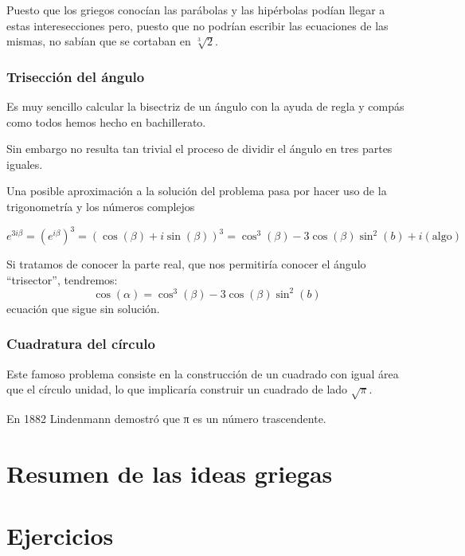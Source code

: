 \documentclass{apuntes}
\begin{document}
Puesto que los griegos conocían las parábolas y las hipérbolas podían llegar a estas interesecciones pero, puesto que no podrían escribir las ecuaciones de las mismas, no sabían que se cortaban en $\sqrt[3]{2}$.

\subsection{Trisección del ángulo}
Es muy sencillo calcular la bisectriz de un ángulo con la ayuda de regla y compás como todos hemos hecho en bachillerato.

Sin embargo no resulta tan trivial el proceso de dividir el ángulo en tres partes iguales.

Una posible aproximación a la solución del problema pasa por hacer uso de la trigonometría y los números complejos

\[e^{3iβ} = (e^{iβ})^3 = (\cos (β) + i \sin (β))^3 = \cos^3(β)-3\cos(β)\sin^2(b)+i(\text{algo})\]

Si tratamos de conocer la parte real, que nos permitiría conocer el ángulo ``trisector'', tendremos:
\[\cos(α)=\cos^3(β)-3\cos(β)\sin^2(b)\]
ecuación que sigue sin solución.

\subsection{Cuadratura del círculo}
Este famoso problema consiste en la construcción de un cuadrado con igual área que el círculo unidad, lo que implicaría construir un cuadrado de lado $\sqrt{π}$.

En 1882 Lindenmann demostró que π es un número trascendente.


\chapter{Resumen de las ideas griegas}


\appendix
\chapter{Ejercicios}

\printindex
\end{document}

